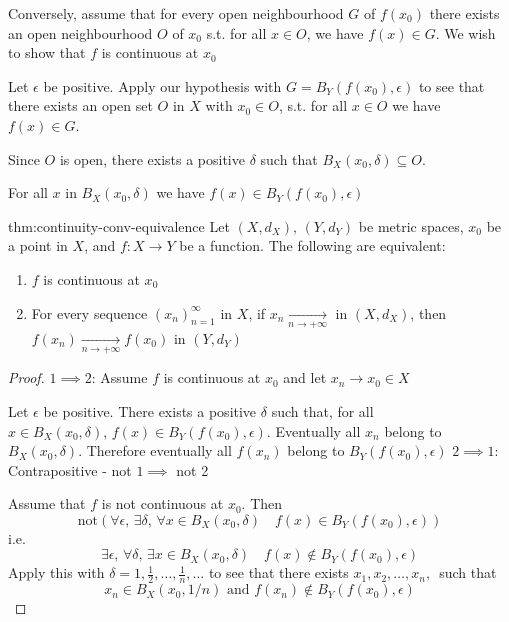 \documentclass[landscape, 8pt]{extarticle}
\begin{document}
\begin{multicols}{3}
Conversely, assume that for every open neighbourhood $G$ of $f(x_{0})$ there exists an open neighbourhood $O$ of $x_{0}$ s.t. for all $x\in O$, we have $f(x)\in G$. We wish to show that $f$ is continuous at $x_{0}$

Let $\epsilon$ be positive. Apply our hypothesis with $G = B_{Y}(f(x_{0}), \epsilon)$ to see that there exists an open set $O$ in $X$ with $x_{0}\in O$, s.t. for all $x\in O$ we have $f(x)\in G$.

Since $O$ is open, there exists a positive $\delta$ such that $B_{X}(x_{0}, \delta) \subseteq O$.

For all $x$ in $B_{X}(x_{0}, \delta)$ we have $f(x) \in B_{Y}(f(x_{0}), \epsilon)$

\begin{thm}{thm:continuity-conv-equivalence}{}
    Let $(X, d_{X}),\, (Y, d_{Y})$ be metric spaces, $x_{0}$ be a point in $X$, and $f : X \to Y$ be a function. The following are equivalent:
    \begin{enumerate}
        \item $f$ is continuous at $x_{0}$
        \item For every sequence $(x_{n})^{\infty}_{n = 1}$ in $X$, if $x_{n}\xrightarrow[n\to +\infty]{}$ in $(X, d_{X})$, then $f(x_{n}) \xrightarrow[n\to +\infty]{} f(x_{0})$ in $(Y, d_{Y})$
    \end{enumerate}
\end{thm}

\begin{proof}
    $1 \implies 2$: Assume $f$ is continuous at $x_{0}$ and let $x_{n}\to x_{0}\in X$

Let $\epsilon$ be positive. There exists a positive $\delta$ such that, for all $x\in B_{X}(x_{0},\delta),\,f(x)\in B_{Y}(f(x_{0}), \epsilon)$. Eventually all $x_{n}$ belong to $B_{X}(x_{0}, \delta)$. Therefore eventually all $f(x_{n})$ belong to $B_{Y}(f(x_{0}), \epsilon)$
$2 \implies 1$: Contrapositive - not $1 \implies$ not 2

Assume that $f$ is not continuous at $x_{0}$. Then
\[\text{not}\left( \forall \epsilon,\,\exists \delta,\,\forall x\in B_{X}(x_{0}, \delta) \quad f(x)\in B_{Y}(f(x_{0}), \epsilon)\right)\]
i.e.
\[\exists \epsilon,\, \forall \delta,\, \exists x\in B_{X}(x_{0},\delta) \quad f(x)\not\in B_{Y}(f(x_{0}), \epsilon)\]
Apply this with $\delta = 1, \frac{1}{2},\dots,\frac{1}{n},\dots$ to see that there exists $x_{1},x_{2},\dots,x_{n},\,$ such that
\[x_{n}\in B_{X}(x_{0}, 1 /n) \text{ and } f(x_{n})\not\in B_{Y}(f(x_{0}), \epsilon)\]


\end{proof}
\end{multicols}
\end{document}
